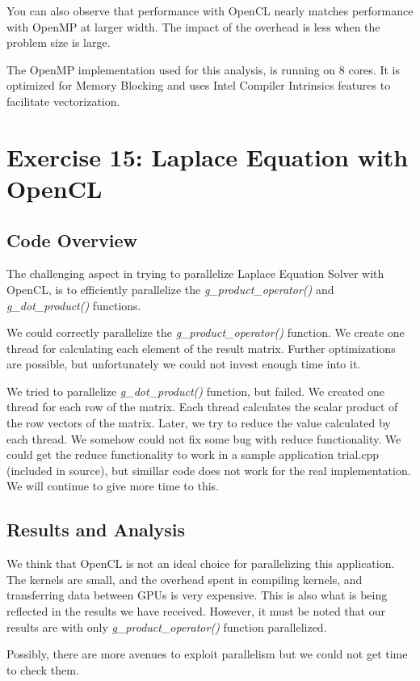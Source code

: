 \documentclass[]{scrartcl}
\begin{document}
You can also observe that performance with OpenCL nearly matches performance with OpenMP at larger width. The impact of the overhead
is less when the problem size is large.

The OpenMP implementation used for this analysis, is running on 8 cores. It is optimized for Memory Blocking and uses Intel
Compiler Intrinsics features to facilitate vectorization.

\pagebreak
\section{Exercise 15: Laplace Equation with OpenCL}

\subsection{Code Overview}
The challenging aspect in trying to parallelize Laplace Equation Solver with OpenCL, is to efficiently parallelize the 
\textit{g\_product\_operator()} and \textit{g\_dot\_product()} functions.

We could correctly parallelize the \textit{g\_product\_operator()} function. We create one thread for calculating each element
of the result matrix. Further optimizations are possible, but unfortunately we could not invest enough time into it.

We tried to parallelize \textit{g\_dot\_product()} function, but failed. We created one thread for each row of the matrix. Each
thread calculates the scalar product of the row vectors of the matrix. Later, we try to reduce the value calculated by each
thread. We somehow could not fix some bug with reduce functionality. We could get the reduce functionality to work in a sample
application trial.cpp (included in source), but simillar code does not work for the real implementation. We will continue to give
more time to this.

\subsection{Results and Analysis}
We think that OpenCL is not an ideal choice for parallelizing this application. The kernels are small, and the overhead spent
in compiling kernels, and transferring data between GPUs is very expensive. This is also what is being reflected in the results we
have received. However, it must be noted that our results are with only \textit{g\_product\_operator()} function parallelized. 

Possibly, there are more avenues to exploit parallelism but we could not get time to check them.
\end{document}
